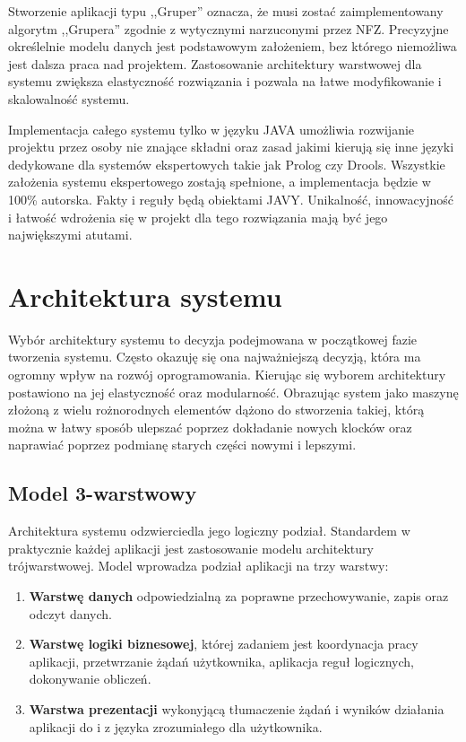 Stworzenie aplikacji typu ,,Gruper'' oznacza, że musi zostać zaimplementowany algorytm ,,Grupera'' zgodnie z wytycznymi narzuconymi przez NFZ. Precyzyjne określelnie modelu danych jest podstawowym założeniem, bez którego niemożliwa jest dalsza praca nad projektem. Zastosowanie architektury warstwowej dla systemu zwiększa elastyczność rozwiązania i pozwala na łatwe modyfikowanie i skalowalność systemu.

Implementacja całego systemu tylko w języku JAVA umożliwia rozwijanie projektu przez osoby nie znające składni oraz zasad jakimi kierują się inne języki dedykowane dla systemów ekspertowych takie jak Prolog czy Drools. Wszystkie założenia systemu ekspertowego zostają spełnione, a implementacja będzie w 100\% autorska. Fakty i reguły będą obiektami JAVY. Unikalność, innowacyjność i łatwość wdrożenia się w projekt dla tego rozwiązania mają być jego największymi atutami.



\section{Architektura systemu}
\label{sec:architekturaSystemu}

Wybór architektury systemu to decyzja podejmowana w początkowej fazie tworzenia systemu. Często okazuję się ona najważniejszą decyzją, która ma ogromny wpływ na rozwój oprogramowania. Kierując się wyborem architektury postawiono na jej elastyczność oraz modularność. Obrazując system jako maszynę złożoną z wielu rożnorodnych elementów dążono do stworzenia takiej, którą można w łatwy sposób ulepszać poprzez dokładanie nowych klocków oraz naprawiać poprzez podmianę starych części nowymi i lepszymi.

\subsection{Model 3-warstwowy}
\label{sec:model3warstwowy}
Architektura systemu odzwierciedla jego logiczny podział. Standardem w praktycznie każdej aplikacji jest zastosowanie modelu architektury trójwarstwowej. Model wprowadza podział aplikacji na trzy warstwy:
\begin{enumerate}
 \item \textbf{Warstwę danych} odpowiedzialną za poprawne przechowywanie, zapis oraz odczyt danych.
 \item \textbf{Warstwę logiki biznesowej}, której zadaniem jest koordynacja pracy aplikacji, przetwrzanie żądań użytkownika, aplikacja reguł logicznych, dokonywanie obliczeń.
 \item \textbf{Warstwa prezentacji} wykonyjącą tłumaczenie żądań i wyników działania aplikacji do i z języka zrozumiałego dla użytkownika.
\end{enumerate}

